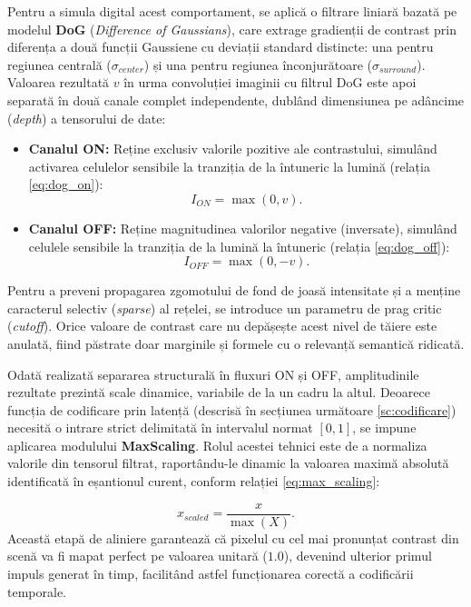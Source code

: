 Pentru a simula digital acest comportament, se aplică o filtrare liniară bazată pe modelul \textbf{DoG} (\textit{Difference of Gaussians})\cite{rodieck1965quantitative}, care extrage gradienții de contrast prin diferența a două funcții Gaussiene cu deviații standard distincte: una pentru regiunea centrală ($\sigma_{center}$) și una pentru regiunea înconjurătoare ($\sigma_{surround}$). Valoarea rezultată $v$ în urma convoluției imaginii cu filtrul DoG este apoi separată în două canale complet independente, dublând dimensiunea pe adâncime (\textit{depth}) a tensorului de date:

\begin{itemize}[noitemsep]
	\item \textbf{Canalul ON:} Reține exclusiv valorile pozitive ale contrastului, simulând activarea celulelor sensibile la tranziția de la întuneric la lumină (relația \eqref{eq:dog_on}):
	\begin{equation}
		\label{eq:dog_on}
		I_{ON} = \max(0, v).
	\end{equation}
	\item \textbf{Canalul OFF:} Reține magnitudinea valorilor negative (inversate), simulând celulele sensibile la tranziția de la lumină la întuneric (relația \eqref{eq:dog_off}):
	\begin{equation}
		\label{eq:dog_off}
		I_{OFF} = \max(0, -v).
	\end{equation}
\end{itemize}

Pentru a preveni propagarea zgomotului de fond de joasă intensitate și a menține caracterul selectiv (\textit{sparse}) al rețelei, se introduce un parametru de prag critic (\textit{cutoff}). Orice valoare de contrast care nu depășește acest nivel de tăiere este anulată, fiind păstrate doar marginile și formele cu o relevanță semantică ridicată.

Odată realizată separarea structurală în fluxuri ON și OFF, amplitudinile rezultate prezintă scale dinamice, variabile de la un cadru la altul. Deoarece funcția de codificare prin latență (descrisă în secțiunea următoare \ref{sc:codificare}) necesită o intrare strict delimitată în intervalul normat $[0, 1]$, se impune aplicarea modulului \textbf{MaxScaling}. Rolul acestei tehnici este de a normaliza valorile din tensorul filtrat, raportându-le dinamic la valoarea maximă absolută identificată în eșantionul curent, conform relației \eqref{eq:max_scaling}:

\begin{equation}
	\label{eq:max_scaling}
	x_{scaled} = \frac{x}{\max(X)}.
\end{equation}
Această etapă de aliniere garantează că pixelul cu cel mai pronunțat contrast din scenă va fi mapat perfect pe valoarea unitară ($1.0$), devenind ulterior primul impuls generat în timp, facilitând astfel funcționarea corectă a codificării temporale.

